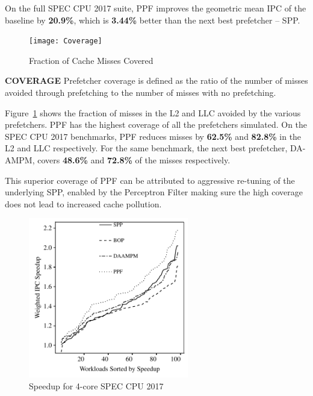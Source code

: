 On the full SPEC CPU 2017 suite, PPF improves the geometric mean IPC of 
the baseline by \textbf{20.9\%}, which is \textbf{3.44\%} better 
than the next best prefetcher -- SPP.
\newline

\begin{figure}[h]
\texttt{[image: Coverage]}
\caption{Fraction of Cache Misses Covered}
\label{Fig:Coverage}
\end{figure}


\noindent \textbf{COVERAGE}
\newline
Prefetcher coverage is defined as the ratio of the number of misses avoided
through prefetching to the number of misses with no prefetching.

Figure~\ref{Fig:Coverage} shows the fraction of misses in the L2 and LLC
avoided by the various prefetchers.  PPF has the highest coverage of all the
prefetchers simulated. On the SPEC CPU 2017 benchmarks, PPF reduces misses by
\textbf{62.5\%} and \textbf{82.8\%} in the L2 and LLC respectively. For the
same benchmark, the next best prefetcher, DA-AMPM, covers \textbf{48.6\%} and
\textbf{72.8\%} of the misses respectively.

This superior coverage of PPF can be attributed to aggressive re-tuning of the
underlying SPP, enabled by the Perceptron Filter making sure the high coverage
does not lead to increased cache pollution.


\begin{figure}[ht]
\includegraphics[width=2.75in]{4CORE_IPC_PPF}
\caption{Speedup for 4-core SPEC CPU 2017}
\label{Fig:4Core_SPEC2017}
\end{figure}

